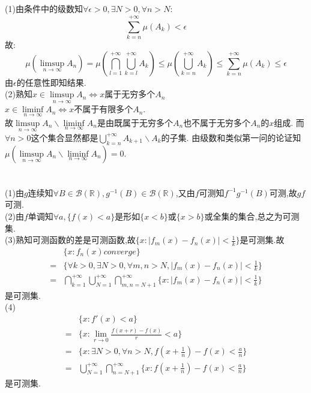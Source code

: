 \documentclass[]{article}
\title{}
\author{}
\begin{document}
\maketitle

\section{}
(1)由条件中的级数知$\forall \epsilon>0,\exists N>0,\forall n>N:$
$$\sum_{k=n}^{+\infty}\mu(A_k)<\epsilon$$故:
$$\mu(\limsup\limits_{n\rightarrow \infty}A_n)=\mu(\bigcap_{l=1}^{+\infty}\bigcup_{k=l}^{+\infty}A_k)\leq \mu(\bigcup_{k=n}^{+\infty}A_k)\leq\sum_{k=n}^{+\infty}\mu(A_k)\leq\epsilon$$
由$\epsilon$的任意性即知结果.\\
(2)熟知$x\in \limsup\limits_{n\rightarrow \infty}A_n\iff x$属于无穷多个$A_n$\\
$x\in \liminf\limits_{n\rightarrow \infty}A_n\iff x$不属于有限多个$A_n$.\\
故$\limsup\limits_{n\rightarrow \infty}A_n\backslash\liminf\limits_{n\rightarrow \infty}A_n$是由既属于无穷多个$A_n$也不属于无穷多个$A_n$的$x$组成.
而$\forall n>0$这个集合显然都是$\bigcup_{k=n}^{+\infty}A_{k+1}\backslash A_k$的子集.
由级数和类似第一问的论证知$\mu(\limsup\limits_{n\rightarrow \infty}A_n\backslash\liminf\limits_{n\rightarrow \infty}A_n)=0$.


\section{}
\noindent(1)由$g$连续知$\forall B \in \mathcal{B}(\mathbb{R}),g^{-1}(B)\in \mathcal{B}(\mathbb{R})$,又由$f$可测知$f^{-1}g^{-1}(B)$可测,故$gf$可测.\\
(2)由$f$单调知$\forall a,\{f(x)<a\}$是形如$\{x<b\}$或$\{x>b\}$或全集的集合,总之为可测集.\\
(3)熟知可测函数的差是可测函数,故$\{x:|f_m(x)-f_n(x)|<\frac{1}{k}\}$是可测集.故
\begin{equation}
	\begin{aligned}
		&\{x:f_n(x)converge\}\\=&
		\{\forall k>0,\exists N>0,\forall m,n>N,|f_m(x)-f_n(x)|<\frac{1}{k}\}
		\\=&\bigcap_{k=1}^{+\infty}\bigcup_{N=1}^{+\infty}\bigcap_{m,n=N+1}^{+\infty}\{x:|f_m(x)-f_n(x)|<\frac{1}{k}\}
	\end{aligned}
\end{equation}
是可测集.\\
(4)\begin{equation}
	\begin{aligned}
		&\{x:f'(x)<a\}\\=&
		\{x:\lim\limits_{r\rightarrow 0}\frac{f(x+r)-f(x)}{r}<a\}\\=&
		\{x:\exists N>0,\forall n>N,f(x+\frac{1}{n})-f(x)<\frac{a}{n}\}\\=&
		\bigcup_{N=1}^{+\infty}\bigcap_{n=N+1}^{+\infty}\{x:f(x+\frac{1}{n})-f(x)<\frac{a}{n}\}
	\end{aligned}
\end{equation}
是可测集.
\end{document}

